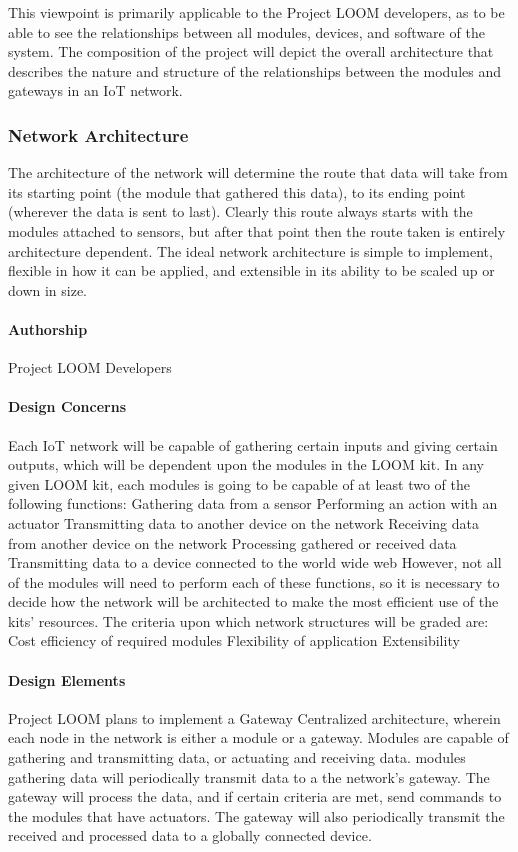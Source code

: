 \documentclass[onecolumn, draftclsnofoot,10pt, compsoc]{IEEEtran}
\begin{document}
This viewpoint is primarily applicable to the Project LOOM developers, as to be able to see the relationships between all modules, devices, and software of the system. The composition of the project will depict the overall architecture that describes the nature and structure of the relationships between the modules and gateways in an IoT network.

\subsubsection{Network Architecture}
The architecture of the network will determine the route that data will take from its starting point (the module that gathered this data), to its ending point (wherever the data is sent to last). Clearly this route always starts with the modules attached to sensors, but after that point then the route taken is entirely architecture dependent. The ideal network architecture is simple to implement, flexible in how it can be applied, and extensible in its ability to be scaled up or down in size. 

\paragraph{Authorship}
Project LOOM Developers

\paragraph{Design Concerns}
Each IoT network will be capable of gathering certain inputs and giving certain outputs, which will be dependent upon the modules in the LOOM kit. In any given LOOM kit, each modules is going to be 
capable of at least two of the following functions:
Gathering data from a sensor
Performing an action with an actuator
Transmitting data to another device on the network
Receiving data from another device on the network
Processing gathered or received data
Transmitting data to a device connected to the world wide web
However, not all of the modules will need to perform each of these functions, so it is
necessary to decide how the network will be architected to make the most efficient
use of the kits' resources. The criteria upon which network structures will be graded are: 
Cost efficiency of required modules
Flexibility of application
Extensibility

\paragraph{Design Elements}
Project LOOM plans to implement a Gateway Centralized architecture, wherein each node in the network is either a module or a gateway. Modules are capable of gathering and transmitting data, or actuating and receiving data. modules gathering data will periodically transmit data to a the network's gateway. The gateway will process the data, and if certain criteria are met, send commands to the modules that have actuators. The gateway will also periodically transmit the received and processed data to a globally connected device. 
\end{document}
